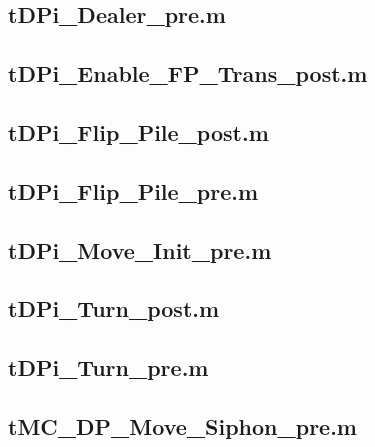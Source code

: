 \documentclass[runningheads,a4paper]{llncs}
\newcommand{\GPenSIM}{../GPenSIM}
\begin{document}
\subsection{tDPi\_Dealer\_pre.m}
\label{app:tDPi_Dealer_pre.m}


\subsection{tDPi\_Enable\_FP\_Trans\_post.m}
\label{app:tDPi_Enable_FP_Trans_post.m}


\subsection{tDPi\_Flip\_Pile\_post.m}
\label{app:tDPi_Flip_Pile_post.m}


\subsection{tDPi\_Flip\_Pile\_pre.m}
\label{app:tDPi_Flip_Pile_pre.m}


\subsection{tDPi\_Move\_Init\_pre.m}
\label{app:tDPi_Move_Init_pre.m}


\subsection{tDPi\_Turn\_post.m}
\label{app:tDPi_Turn_post.m}


\subsection{tDPi\_Turn\_pre.m}
\label{app:tDPi_Turn_pre.m}


\subsection{tMC\_DP\_Move\_Siphon\_pre.m}
\label{app:tMC_DP_Move_Siphon_pre.m}

\end{document}
